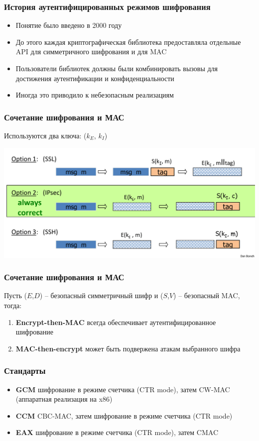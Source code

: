 \documentclass{beamer}
\begin{document}
\begin{frame}
  \frametitle{История аутентифицированных режимов шифрования}

  \begin{itemize}
    \item{Понятие было введено в 2000 году}
    \item{До этого каждая криптографическая библиотека предоставляла отдельные API для симметричного шифрования и для MAC}
    \item{Пользователи библиотек должны были комбинировать вызовы для достижения аутентификации и конфиденциальности}
    \item{Иногда это приводило к небезопасным реализациям}
  \end{itemize}
\end{frame}

\begin{frame}
  \frametitle{Сочетание шифрования и МАС}

  Используются два ключа: ($k_{E}$, $k_{I}$)

  \includegraphics[width=\linewidth]{./img/png/combining_MAC_ENC.png}
\end{frame}

\begin{frame}
  \frametitle{Сочетание шифрования и МАС}

  Пусть ($E$,$D$) -- безопасный симметричный шифр и ($S$,$V$) -- безопасный MAC, тогда:

  \begin{enumerate}
    \item{\textbf{Encrypt-then-MAC} всегда обеспечивает аутентифицированное шифрование}
    \item{\textbf{MAC-then-encrypt} может быть подвержена атакам выбранного шифра}
  \end{enumerate}
\end{frame}

\begin{frame}
  \frametitle{Стандарты}

  \begin{itemize}
    \item{\textbf{GCM} шифрование в режиме счетчика (CTR mode), затем CW-MAC (аппаратная реализация на x86)}
    \item{\textbf{CCM} CBC-MAC, затем шифрование в режиме счетчика (CTR mode)}
    \item{\textbf{EAX} шифрование в режиме счетчика (CTR mode), затем CMAC}
  \end{itemize}
\end{frame}
\end{document}
